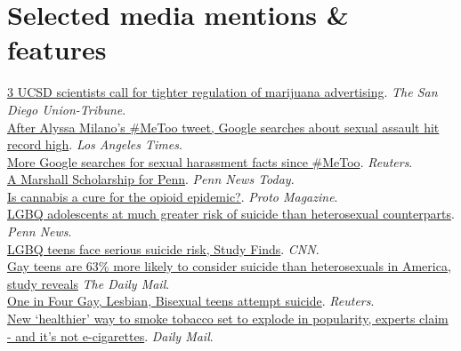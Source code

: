 \documentclass[10pt, letterpaper]{article}
\begin{document}
\section*{Selected media mentions \& features}
\href{https://www.sandiegouniontribune.com/news/public-safety/story/2019-05-19/uc-san-diego-calls-for-tighter-regulation-of-marijuana-advertising}{3 UCSD scientists call for tighter regulation of marijuana advertising}. \emph{The San Diego Union-Tribune}.\\[.2cm]
\href{https://www.latimes.com/science/sciencenow/la-sci-sn-metoo-google-searches-20181221-story.html}{After Alyssa Milano’s \#MeToo tweet, Google searches about sexual assault hit record high}. \emph{Los Angeles Times}.\\[.2cm]
\href{https://www.reuters.com/article/us-health-metoo/more-google-searches-for-sexual-harassment-facts-since-metoo-idUSKCN1OK28L}{More Google searches for sexual harassment facts since \#MeToo}. \emph{Reuters}.\\[.2cm]
\href{https://penntoday.upenn.edu/news/marshall-scholarship-penn-0}{A Marshall Scholarship for Penn}. \emph{Penn News Today}.\\[.2cm]
\href{http://protomag.com/articles/cannabis-cure-opioid-crisis}{Is cannabis a cure for the opioid epidemic?}. \emph{Proto Magazine}.\\[.2cm]
\href{https://news.upenn.edu/news/lgbq-adolescents-much-greater-risk-suicide-heterosexual-counterparts}{LGBQ adolescents at much greater risk of suicide than heterosexual counterparts}. \emph{Penn News}.\\[.2cm]
\href{http://www.cnn.com/2017/12/19/health/lgbq-teens-suicide-risk-study/index.html}{LGBQ teens face serious suicide risk, Study Finds}. \emph{CNN}.\\[.2cm]
\href{http://www.dailymail.co.uk/health/article-5195087/Gay-teens-63-percent-risk-suicide.html#ixzz53bjORYm5}{Gay teens are 63\% more likely to consider suicide than heterosexuals in America, study reveals} \emph{The Daily Mail}.\\[.2cm]
\href{https://www.reuters.com/article/us-health-teens-lgbq-suicide/one-in-four-gay-lesbian-bisexual-teens-attempt-suicide-idUSKBN1ED2LS}{One in Four Gay, Lesbian, Bisexual teens attempt suicide}. \emph{Reuters}.\\[.2cm]
\href{http://www.dailymail.co.uk/health/article-4972816/New-healthier-way-smoke-set-overtake-vaping.html}{New ‘healthier’ way to smoke tobacco set to explode in popularity, experts claim - and it's not e-cigarettes}. \emph{Daily Mail}.\\[.2cm]
\end{document}
